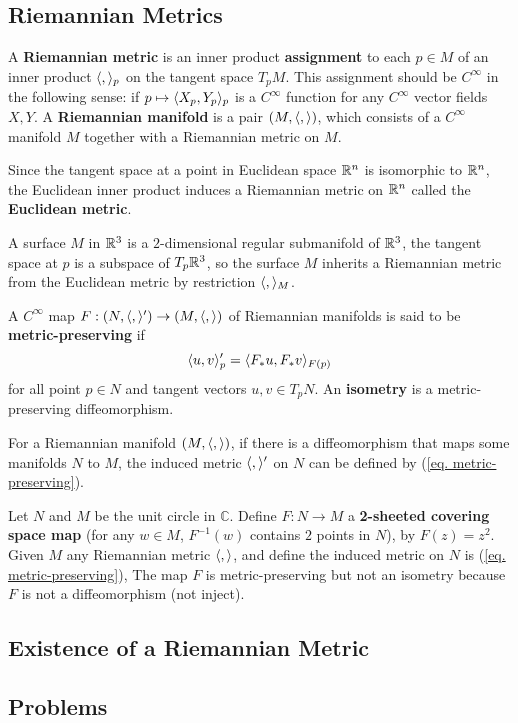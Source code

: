 \subsection{Riemannian Metrics}
\begin{definition}
    A \textbf{Riemannian metric} is an inner product \textbf{assignment} 
    to each $p \in M$ of an inner product $\langle ,  \rangle_p$ on the tangent space $T_p M$.
    This assignment should be $C^\infty$ in the following sense: 
    if $p \mapsto \langle X_p, Y_p \rangle_p$ is a $C^\infty$ function for any $C^\infty$ 
    vector fields $X,Y$. A \textbf{Riemannian manifold} is a pair $(M, \langle ,  \rangle)$, 
    which consists of a $C^\infty$ manifold $M$ together with 
    a Riemannian metric on $M$.
\end{definition}
\begin{example}
    Since the tangent space at a point in Euclidean space ${\mathbb{R}}^n$ 
    is isomorphic to ${\mathbb{R}}^n$, the Euclidean inner product induces a Riemannian metric 
    on ${\mathbb{R}}^n$ called the \textbf{Euclidean metric}.
\end{example}
\begin{example}
    A surface $M$ in ${\mathbb{R}}^3$ is a $2$-dimensional regular submanifold of ${\mathbb{R}}^3$, 
    the tangent space at $p$ is a subspace of $T_p{\mathbb{R}}^3$, so the surface $M$ inherits 
    a Riemannian metric from the Euclidean metric by restriction $\langle ,  \rangle_M$.
\end{example}
\begin{definition}
    A $C^\infty$ map $F: (N, \langle ,  \rangle') \rightarrow (M, \langle ,  \rangle)$ of Riemannian manifolds is said to be \textbf{metric-preserving} if 
    \begin{equation}
        \langle u, v \rangle'_p = \langle F_*u, F_*v \rangle_{F(p)}
        \label{eq. metric-preserving}
    \end{equation}
    for all point $p \in N$ and tangent vectors $u,v \in T_p N$. An \textbf{isometry}
    is a metric-preserving diffeomorphism.
\end{definition}
For a Riemannian manifold $(M, \langle ,  \rangle)$, if there is a diffeomorphism that maps some
manifolds $N$ to $M$, the induced metric $\langle ,  \rangle'$ on $N$
 can be defined by (\ref{eq. metric-preserving}).
\begin{example}
    Let $N$ and $M$ be the unit circle in $\mathbb{C}$. 
    Define $F: N \rightarrow M$ a \textbf{2-sheeted covering space map} 
    (for any $w \in M$, $F^{-1}(w)$ contains $2$ points in $N$), by $F(z)=z^2$. Given $M$
    any Riemannian metric $\langle ,  \rangle$, and define the induced metric on $N$ is (\ref{eq. metric-preserving}),
    The map $F$ is metric-preserving 
    but not an isometry because $F$ is not a diffeomorphism (not inject).
\end{example}
\begin{example}
    
\end{example}
\subsection{Existence of a Riemannian Metric}

\subsection{Problems}